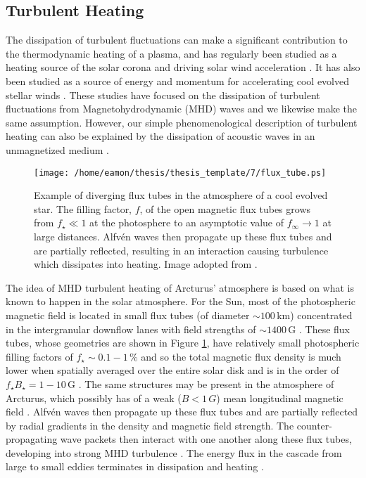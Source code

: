 \subsection{Turbulent Heating}\label{sec:7.4.3}
The dissipation of turbulent fluctuations can make a significant contribution to the thermodynamic heating of a plasma, and has regularly been studied as a heating source of the solar corona and driving solar wind acceleration \citep[e.g.,][]{lehe_2009, cranmer_2007}. It has also been studied as a source of energy and momentum for accelerating cool evolved stellar winds \citep[e.g.,][]{falceta_2006, hartmann_1980}. These studies have focused on the dissipation of turbulent fluctuations from Magnetohydrodynamic (MHD) waves and we likewise make the same assumption. However, our simple phenomenological description of turbulent heating can also be explained by the dissipation of acoustic waves in an unmagnetized medium \citep[e.g.,][]{lighthill_1952,stein_1967}.

\begin{figure}[!ht]
\centering 
         \texttt{[image: /home/eamon/thesis/thesis\_template/7/flux\_tube.ps]}
\caption[Example of diverging flux tubes]{Example of diverging flux tubes in the atmosphere of a cool evolved star. The filling factor, $f$, of the open magnetic flux tubes grows from $f_{\star} \ll 1$ at the photosphere to an asymptotic value of $f_{\infty} \rightarrow 1$ at large distances. Alfv\'en waves then propagate up these flux tubes and are partially reflected, resulting in an interaction causing turbulence which dissipates into heating. Image adopted from \cite{cranmer_2011}.}
\label{fig:7.4}
\end{figure}

The idea of MHD turbulent heating of Arcturus' atmosphere is based on what is known to happen in the solar atmosphere. For the Sun, most of the photospheric magnetic field is located in small flux tubes (of diameter $\sim 100$\,km) concentrated in the intergranular downflow lanes with field strengths of $\sim 1400$\,G \citep{berger_2001}. These flux tubes, whose geometries are shown in Figure \ref{fig:7.4}, have relatively small photospheric filling factors of $f_{\star} \sim 0.1-1\, \%$ and so the total magnetic flux density is much lower when spatially averaged over the entire solar disk and is in the order of $f_{\star}B_{\star}=1-10$\,G \citep{schrijver_1989}. The same structures may be present in the atmosphere of Arcturus, which possibly has of a weak ($B < 1\,G$) mean longitudinal magnetic field \citep{sennhauser_2011}. Alfv\'en waves then propagate up these flux tubes and are partially reflected by radial gradients in the density and magnetic field strength. The counter-propagating wave packets then interact with one another along these flux tubes, developing into strong MHD turbulence \citep{iroshnikov_1964}. The energy flux in the cascade from large to small eddies terminates in dissipation and heating \citep[e.g.,][]{matthaeus_1999, cranmer_2005}.

